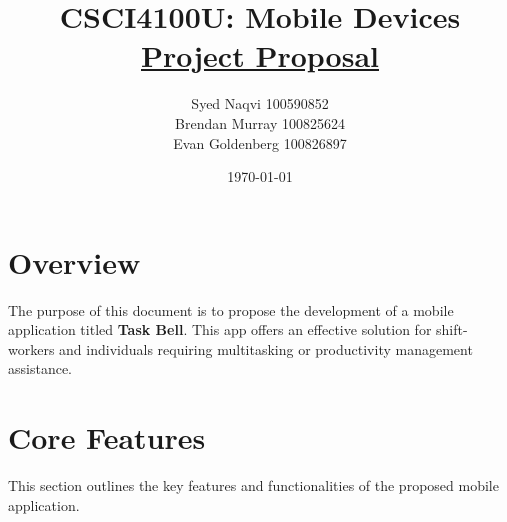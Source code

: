 \documentclass{article}
\title{\vspace*{100pt}CSCI4100U: Mobile Devices \\ \underline{Project Proposal} \vspace*{30pt}}
\author{
    Syed Naqvi 100590852\\ 
    Brendan Murray 100825624\\ 
    Evan Goldenberg 100826897
    \vspace*{30pt}
}
\date{\today}
\begin{document}
\maketitle
\newpage

\tableofcontents
\newpage

\section{Overview}
The purpose of this document is to propose the development of a mobile application titled \textbf{Task Bell}.
This app offers an effective solution for shift-workers and individuals requiring multitasking
or productivity management assistance.

\section{Core Features}
This section outlines the key features and functionalities of the proposed mobile application.
\end{document}
